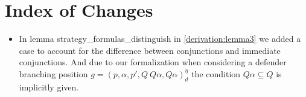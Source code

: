 \section{Index of Changes}

\begin{itemize}
   \item In lemma strategy_formulas_distinguish in  \ref{derivation:lemma3} we added a case to account for the difference between 
conjunctions and immediate conjunctions. And due to our formalization when considering a
defender branching position $g=(p,\alpha ,p', Q \ Q\alpha, Q\alpha)_d^\eta$ the condition 
$Q \alpha \subseteq Q$ is implicitly given.
\end{itemize}